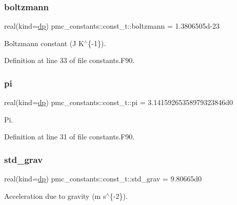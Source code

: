 \subsubsection{\texorpdfstring{boltzmann}{boltzmann}}
{\footnotesize\ttfamily real(kind=\mbox{\hyperlink{namespacepmc__constants_a396b7709ed4da67dac74cb46a1466ed6}{dp}}) pmc\+\_\+constants\+::const\+\_\+t\+::boltzmann = 1.\+3806505d-\/23}



Boltzmann constant (J K$^\wedge$\{-\/1\}). 



Definition at line 33 of file constants.\+F90.

\mbox{\label{structpmc__constants_1_1const__t_a1e0c76a6a3ef6fce9fed5ffc94a11704}} 
\subsubsection{\texorpdfstring{pi}{pi}}
{\footnotesize\ttfamily real(kind=\mbox{\hyperlink{namespacepmc__constants_a396b7709ed4da67dac74cb46a1466ed6}{dp}}) pmc\+\_\+constants\+::const\+\_\+t\+::pi = 3.\+14159265358979323846d0}



Pi. 



Definition at line 31 of file constants.\+F90.

\mbox{\label{structpmc__constants_1_1const__t_ae73431b88abb58acae0a1dec5a167a26}} 
\subsubsection{\texorpdfstring{std\+\_\+grav}{std\_grav}}
{\footnotesize\ttfamily real(kind=\mbox{\hyperlink{namespacepmc__constants_a396b7709ed4da67dac74cb46a1466ed6}{dp}}) pmc\+\_\+constants\+::const\+\_\+t\+::std\+\_\+grav = 9.\+80665d0}



Acceleration due to gravity (m s$^\wedge$\{-\/2\}). 



